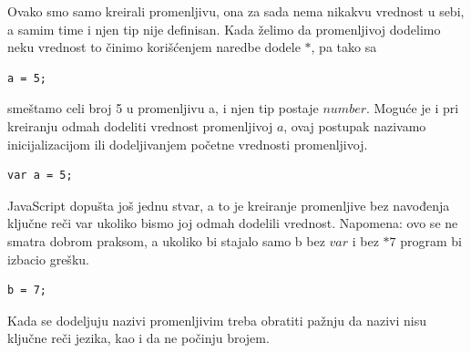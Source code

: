 \documentclass[a4paper]{article}
\begin{document}
Ovako smo samo kreirali promenljivu, ona za sada nema nikakvu vrednost u sebi, a samim time i njen tip nije definisan. Kada želimo da promenljivoj dodelimo neku vrednost to činimo korišćenjem naredbe dodele $*$, pa tako sa
\begin{lstlisting}[backgroundcolor = \color{lightgray}]
a = 5;    
\end{lstlisting}
smeštamo celi broj 5 u promenljivu a, i njen tip postaje $number$.
Moguće je i pri kreiranju odmah dodeliti vrednost promenljivoj $a$, ovaj postupak nazivamo inicijalizacijom ili dodeljivanjem početne vrednosti promenljivoj.
\begin{lstlisting}[backgroundcolor = \color{lightgray}]
var a = 5;    
\end{lstlisting}
JavaScript dopušta još jednu stvar, a to je kreiranje promenljive bez navođenja ključne reči var ukoliko bismo joj odmah dodelili vrednost. Napomena: ovo se ne smatra dobrom praksom, a ukoliko bi stajalo samo b bez $var$ i bez $*7$ program bi izbacio grešku.
\begin{lstlisting}[backgroundcolor = \color{lightgray}]
b = 7;    
\end{lstlisting}
Kada se dodeljuju nazivi promenljivim treba obratiti pažnju da nazivi nisu ključne reči jezika, kao i da ne počinju brojem.\\\\
\end{document}
